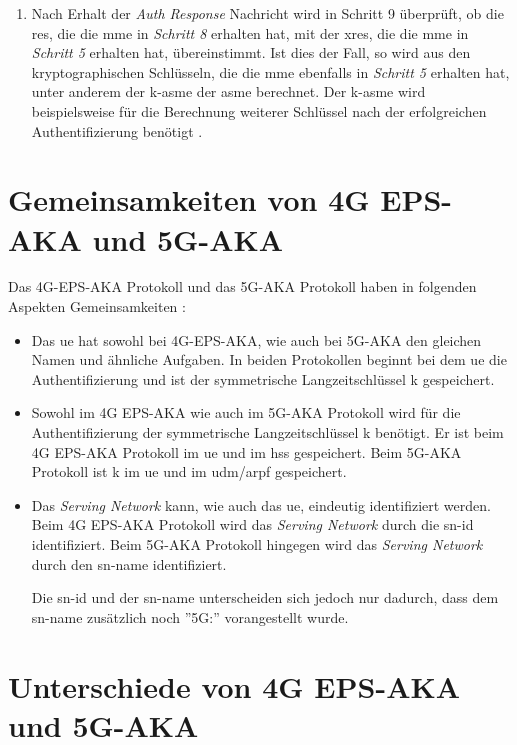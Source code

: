 \begin{enumerate}
\item Nach Erhalt der \textit{Auth Response} Nachricht wird in Schritt 9 überprüft, ob die \gls{res}, die die \gls{mme} in \textit{Schritt 8} erhalten hat, mit der \gls{xres}, die die \gls{mme} in \textit{Schritt 5} erhalten hat, übereinstimmt.
Ist dies der Fall, so wird aus den kryptographischen Schlüsseln, die die \gls{mme} ebenfalls in \textit{Schritt 5} erhalten hat, unter anderem der \gls{k-asme} der \gls{asme} berechnet.
Der \gls{k-asme} wird beispielsweise für die Berechnung weiterer Schlüssel nach der erfolgreichen Authentifizierung benötigt \cite[19]{3gppTS33.401V15.4.0}.
\end{enumerate}


\section{Gemeinsamkeiten von 4G EPS-AKA und 5G-AKA}
Das 4G-EPS-AKA Protokoll und das 5G-AKA Protokoll haben in folgenden Aspekten Gemeinsamkeiten \cite{Compare}: 

\begin{itemize}
\item Das \gls{ue} hat sowohl bei 4G-EPS-AKA, wie auch bei 5G-AKA den gleichen Namen und ähnliche Aufgaben.
In beiden Protokollen beginnt bei dem \gls{ue} die Authentifizierung und ist der symmetrische Langzeitschlüssel \gls{k} gespeichert.

\item Sowohl im 4G EPS-AKA wie auch im 5G-AKA Protokoll wird für die Authentifizierung der symmetrische Langzeitschlüssel \gls{k} benötigt.
Er ist beim 4G EPS-AKA Protokoll im \gls{ue} und im \gls{hss} gespeichert.
Beim 5G-AKA Protokoll ist \gls{k} im \gls{ue} und im \gls{udm}/\gls{arpf} gespeichert.

\item Das \textit{Serving Network} kann, wie auch das \gls{ue}, eindeutig identifiziert werden.
Beim 4G EPS-AKA Protokoll wird das \textit{Serving Network} durch die \gls{sn-id} identifiziert.
Beim 5G-AKA Protokoll hingegen wird das \textit{Serving Network} durch den \gls{sn-name} identifiziert.

Die \gls{sn-id} und der \gls{sn-name} unterscheiden sich jedoch nur dadurch, dass dem \gls{sn-name} zusätzlich noch ''5G:'' vorangestellt wurde.
\end{itemize}


\newpage
\section{Unterschiede von 4G EPS-AKA und 5G-AKA}

